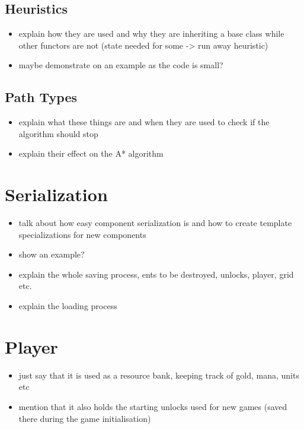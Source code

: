 \subsection{Heuristics}

\begin{itemize}
    \item explain how they are used and why they are inheriting a base class
        while other functors are not (state needed for some -> run away heuristic)
    \item maybe demonstrate on an example as the code is small?
\end{itemize}

\subsection{Path Types}

\begin{itemize}
    \item explain what these things are and when they are used to check
        if the algorithm should stop
    \item explain their effect on the A* algorithm
\end{itemize}

\section{Serialization}

\begin{itemize}
    \item talk about how easy component serialization is and how
        to create template specializations for new components
    \item show an example?
    \item explain the whole saving process, ents to be destroyed, unlocks,
        player, grid etc.
    \item explain the loading process
\end{itemize}

\section{Player}

\begin{itemize}
    \item just say that it is used as a resource bank, keeping track
        of gold, mana, units etc
    \item mention that it also holds the starting unlocks used for new games
        (saved there during the game initialisation)
\end{itemize}

